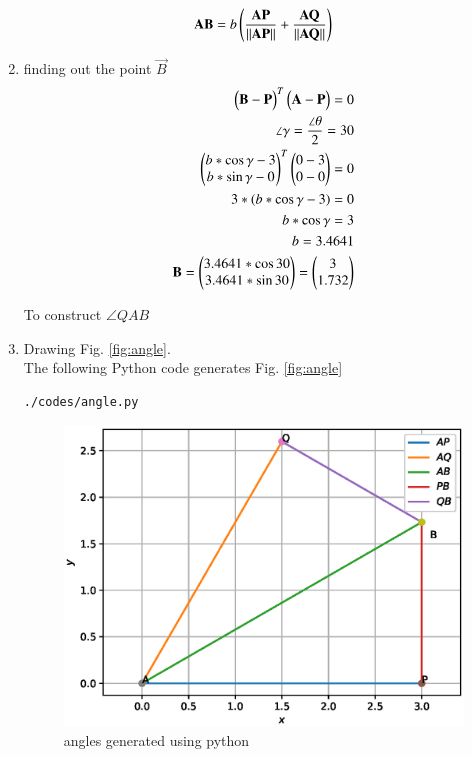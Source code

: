 \begin{enumerate}[label=\thesection.\arabic*.,ref=\thesection.\theenumi]
\begin{align}
\mathbf{AB} =  b\left(\frac{\mathbf{AP}}{\left\lVert\mathbf{AP}\right\rVert} + \frac{\mathbf{AQ}}{\left\lVert\mathbf{AQ}\right\rVert}\right)
\end{align}
\item finding out the point $\vec{B}$
\\
\begin{align}
\begin{pmatrix}\mathbf{B} - \mathbf{P}\end{pmatrix}^T \begin{pmatrix}\mathbf{A} - \mathbf{P}\end{pmatrix} = 0
\\
\angle{\gamma} = \frac{\angle{\theta}}{2} = 30
\\
\begin{pmatrix}b*\cos{\gamma} - 3 \\ b*\sin{\gamma} - 0\end{pmatrix}^T \begin{pmatrix}0 - 3 \\ 0 - 0\end{pmatrix} = 0
\\
3*(b*\cos{\gamma} - 3) = 0
\\
b*\cos{\gamma} = 3
\\
b = 3.4641
\\
\mathbf{B} = \begin{pmatrix}3.4641*\cos{30}\\3.4641*\sin{30}\end{pmatrix} = \begin{pmatrix}3\\1.732\end{pmatrix}
\end{align}
\begin{table}[ht!]
	\centering
	
	\caption{To construct $\angle QAB$}
	\label{table:table1}	
\end{table}
\item Drawing  Fig. \ref{fig:angle}.	
\\
 The  following Python code generates Fig. \ref{fig:angle}
 \\
%
\begin{lstlisting}
./codes/angle.py
\end{lstlisting}
\begin{figure}[!ht]
\centering
\includegraphics[width=\columnwidth]{./figs/angle.eps}
\caption{angles generated using python}
\label{fig:angle_py}
\end{figure}


\end{enumerate}
